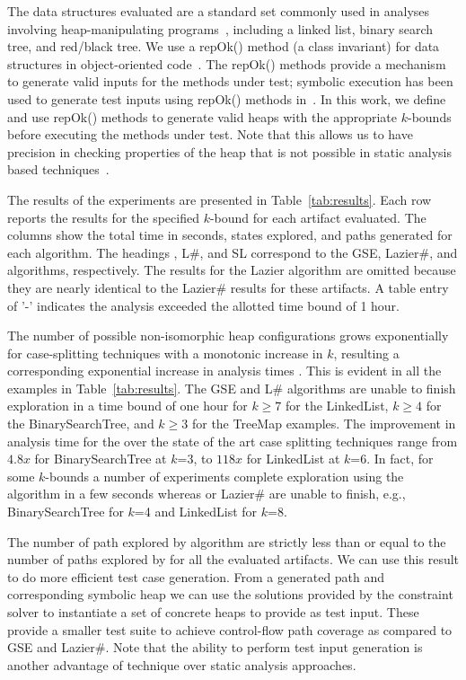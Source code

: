 The data structures evaluated are a standard set commonly used in
analyses involving heap-manipulating
programs~\cite{Deng:2006,Deng:2007,boyapati2002korat,Ferrara:2014,Rosner:2015},
including a linked list, binary search tree, and red/black tree. We
use a repOk() method (a class invariant) for data structures in
object-oriented code~\cite{boyapati2002korat}. The repOk() methods
provide a mechanism to generate valid inputs for the methods under
test; symbolic execution has been used to generate test inputs using
repOk() methods in~\cite{visser2004test}. In this work, we define and
use repOk() methods to generate valid heaps with the appropriate
$k$-bounds before executing the methods under test. Note that this
allows us to have precision in checking properties of the heap that is
not possible in static analysis based techniques~\cite{Dillig:2011}.

The results of the experiments are presented in
Table~\ref{tab:results}.  Each row reports the results for the
specified $k$-bound for each artifact evaluated. The columns show the
total time in seconds, states explored, and paths generated for each
algorithm. The headings \gsetxt{}, L\#, and SL correspond to the GSE,
Lazier\#, and \symtxt{} algorithms, respectively. The results for the
Lazier algorithm are omitted because they are nearly identical to the
Lazier\# results for these artifacts. A table entry of '-' indicates
the analysis exceeded the allotted time bound of 1 hour.

The number of possible non-isomorphic heap configurations grows
exponentially for case-splitting techniques with a monotonic increase
in $k$, resulting a corresponding exponential increase in analysis
times . This is evident in all the examples in
Table~\ref{tab:results}. The GSE and L\# algorithms are unable to
finish exploration in a time bound of one hour for $k\geq 7$ for the
LinkedList, $k\geq 4$ for the BinarySearchTree, and $k\geq 3$ for the
TreeMap examples. The improvement in analysis time for the \symtxt{}
over the state of the art case splitting techniques range from $4.8x$
for BinarySearchTree at $k$=3, to $118x$ for LinkedList at $k$=6. In
fact, for some $k$-bounds a number of experiments complete exploration
using the \symtxt{} algorithm in a few seconds whereas \gsetxt{} or
Lazier\# are unable to finish, e.g., BinarySearchTree for $k$=4 and
LinkedList for $k$=8. 

The number of path explored by \symtxt{} algorithm are strictly less
than or equal to the number of paths explored by \gsetxt{} for all the
evaluated artifacts. We can use this result to do more efficient test
case generation. From a generated path and corresponding symbolic heap
we can use the solutions provided by the constraint solver to
instantiate a set of concrete heaps to provide as test input. These
provide a smaller test suite to achieve control-flow path coverage as
compared to GSE and Lazier\#. Note that the ability to perform test
input generation is another advantage of \symtxt{} technique over
static analysis approaches.

